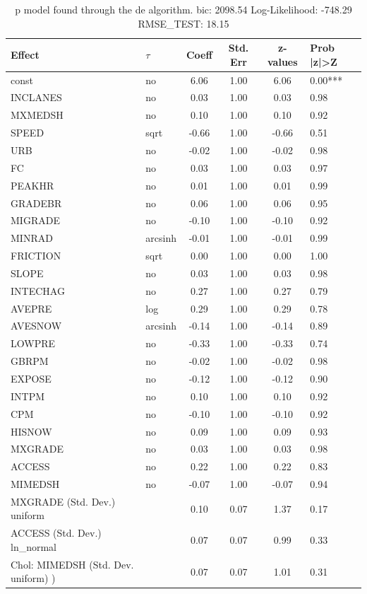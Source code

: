 \begin{table}
	\caption{p model found through the de algorithm. bic: 2098.54 Log-Likelihood: -748.29 RMSE_TEST: 18.15}
	\begin{center}
		\begin{tabular}{|l|l|c|c|c|l|}
			\hline
			Effect & $\tau$ & Coeff & Std. Err & z-values & Prob |z|>Z \\
			\hline
			const & no & 6.06 & 1.00 & 6.06 & 0.00*** \\
			\hline
			INCLANES & no & 0.03 & 1.00 & 0.03 & 0.98 \\
			\hline
			MXMEDSH & no & 0.10 & 1.00 & 0.10 & 0.92 \\
			\hline
			SPEED & sqrt & -0.66 & 1.00 & -0.66 & 0.51 \\
			\hline
			URB & no & -0.02 & 1.00 & -0.02 & 0.98 \\
			\hline
			FC & no & 0.03 & 1.00 & 0.03 & 0.97 \\
			\hline
			PEAKHR & no & 0.01 & 1.00 & 0.01 & 0.99 \\
			\hline
			GRADEBR & no & 0.06 & 1.00 & 0.06 & 0.95 \\
			\hline
			MIGRADE & no & -0.10 & 1.00 & -0.10 & 0.92 \\
			\hline
			MINRAD & arcsinh & -0.01 & 1.00 & -0.01 & 0.99 \\
			\hline
			FRICTION & sqrt & 0.00 & 1.00 & 0.00 & 1.00 \\
			\hline
			SLOPE & no & 0.03 & 1.00 & 0.03 & 0.98 \\
			\hline
			INTECHAG & no & 0.27 & 1.00 & 0.27 & 0.79 \\
			\hline
			AVEPRE & log & 0.29 & 1.00 & 0.29 & 0.78 \\
			\hline
			AVESNOW & arcsinh & -0.14 & 1.00 & -0.14 & 0.89 \\
			\hline
			LOWPRE & no & -0.33 & 1.00 & -0.33 & 0.74 \\
			\hline
			GBRPM & no & -0.02 & 1.00 & -0.02 & 0.98 \\
			\hline
			EXPOSE & no & -0.12 & 1.00 & -0.12 & 0.90 \\
			\hline
			INTPM & no & 0.10 & 1.00 & 0.10 & 0.92 \\
			\hline
			CPM & no & -0.10 & 1.00 & -0.10 & 0.92 \\
			\hline
			HISNOW & no & 0.09 & 1.00 & 0.09 & 0.93 \\
			\hline
			MXGRADE & no & 0.03 & 1.00 & 0.03 & 0.98 \\
			\hline
			ACCESS & no & 0.22 & 1.00 & 0.22 & 0.83 \\
			\hline
			MIMEDSH & no & -0.07 & 1.00 & -0.07 & 0.94 \\
			\hline
			MXGRADE (Std. Dev.) uniform &  & 0.10 & 0.07 & 1.37 & 0.17 \\
			\hline
			ACCESS (Std. Dev.) ln_normal &  & 0.07 & 0.07 & 0.99 & 0.33 \\
			\hline
			 Chol: MIMEDSH (Std. Dev. uniform) ) &  & 0.07 & 0.07 & 1.01 & 0.31 \\
			\hline
		\end{tabular}
	\end{center}
\end{table}